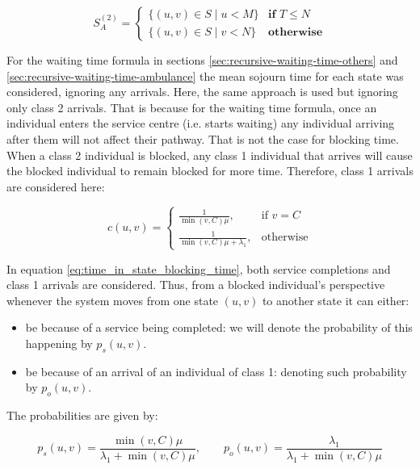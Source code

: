 \begin{equation*}
    S_A^{(2)}=
    \begin{cases}
        \{(u, v) \in S \; | \; u < M \} & \textbf{if } T \leq N\\
        \{(u, v) \in S \; | \; v < N \} & \textbf{otherwise}
    \end{cases}
\end{equation*}

For the waiting time formula in sections \ref{sec:recursive-waiting-time-others}
and \ref{sec:recursive-waiting-time-ambulance}
the mean sojourn time for each state was considered,
ignoring any arrivals. Here, the same approach is used but ignoring only class 2
arrivals. That is because for the waiting time formula, once an individual enters 
the service centre (i.e. starts waiting) any individual arriving after them will 
not affect their
pathway. That is not the case for blocking time. When a class 2 individual is 
blocked, 
any class 1 individual that arrives will cause the blocked individual to remain 
blocked for more time. Therefore, class 1 arrivals are considered here:

\begin{equation}\label{eq:time_in_state_blocking_time}
    c(u,v) = 
    \begin{cases}
        \frac{1}{\min(v,C) \mu}, & \text{if } v = C\\
        \frac{1}{\min(v,C) \mu + \lambda_1}, & \text{otherwise}
    \end{cases}
\end{equation}
 
In equation \ref{eq:time_in_state_blocking_time}, both service completions and 
class 1 arrivals are considered. 
Thus, from a blocked individual's perspective whenever the system moves from one 
state \((u,v)\)
to another state it can either:

\begin{itemize}
    \item be because of a service being completed: we will denote the probability 
    of this happening by \(p_s(u,v)\). 
    \item be because of an arrival of an individual of class 1: denoting such 
    probability by \(p_o(u,v)\).
\end{itemize}
The probabilities are given by:

\begin{equation*}
    p_s(u,v) = \frac{\min(v,C)\mu}{\lambda_1 + \min(v,C)\mu}, \qquad
    p_o(u,v) = \frac{\lambda_1}{\lambda_1 + \min(v,C)\mu}
\end{equation*}


